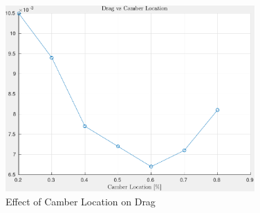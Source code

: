 \documentclass[letterpaper,12pt,]{article}
\begin{document}
\begin{figure}[!h]
    \centering
    \includegraphics[width = 0.85\textwidth]{./figures/q5dcamloc.pdf}
    \caption{Effect of Camber Location on Drag}
    \label{fig:q5cdrag}
\end{figure}
\end{document}
